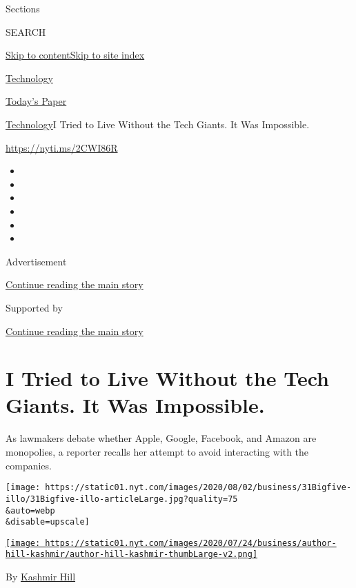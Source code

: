 Sections

SEARCH

\protect\hyperlink{site-content}{Skip to
content}\protect\hyperlink{site-index}{Skip to site index}

\href{https://www.nytimes.com/section/technology}{Technology}

\href{https://myaccount.nytimes.com/auth/login?response_type=cookie\&client_id=vi}{}

\href{https://www.nytimes.com/section/todayspaper}{Today's Paper}

\href{/section/technology}{Technology}\textbar{}I Tried to Live Without
the Tech Giants. It Was Impossible.

\url{https://nyti.ms/2CWI86R}

\begin{itemize}
\item
\item
\item
\item
\item
\item
\end{itemize}

Advertisement

\protect\hyperlink{after-top}{Continue reading the main story}

Supported by

\protect\hyperlink{after-sponsor}{Continue reading the main story}

\hypertarget{i-tried-to-live-without-the-tech-giants-it-was-impossible}{%
\section{I Tried to Live Without the Tech Giants. It Was
Impossible.}\label{i-tried-to-live-without-the-tech-giants-it-was-impossible}}

As lawmakers debate whether Apple, Google, Facebook, and Amazon are
monopolies, a reporter recalls her attempt to avoid interacting with the
companies.

\texttt{[image: https://static01.nyt.com/images/2020/08/02/business/31Bigfive-illo/31Bigfive-illo-articleLarge.jpg?quality=75\\\&auto=webp\\\&disable=upscale]}

\href{https://www.nytimes.com/by/kashmir-hill}{\texttt{[image: https://static01.nyt.com/images/2020/07/24/business/author-hill-kashmir/author-hill-kashmir-thumbLarge-v2.png]}}

By \href{https://www.nytimes.com/by/kashmir-hill}{Kashmir Hill}

